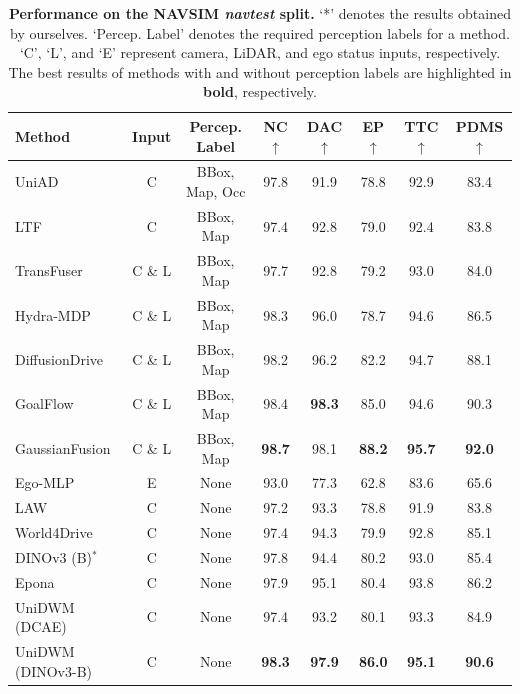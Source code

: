 \begin{table}[t]
\centering
\caption{\textbf{Performance on the NAVSIM \textit{navtest} split.} `*' denotes the results obtained by ourselves. `Percep. Label' denotes the required perception labels for a method. `C', `L', and `E' represent camera, LiDAR, and ego status inputs, respectively. The best results of methods with and without perception labels are highlighted in \textbf{bold}, respectively. }
\begin{tabular}{lccccccc}
\toprule
\textbf{Method} & \textbf{Input} & \textbf{Percep. Label} & \textbf{NC} $\uparrow$ & \textbf{DAC} $\uparrow$ & \textbf{EP} $\uparrow$ & \textbf{TTC} $\uparrow$ & \textbf{PDMS} $\uparrow$ \\
\midrule
UniAD \cite{hu2023planning} & C & BBox, Map, Occ & 97.8 & 91.9 & 78.8 & 92.9 & 83.4 \\
LTF \cite{transfuser} & C & BBox, Map & 97.4 & 92.8 & 79.0 & 92.4 & 83.8 \\
TransFuser \cite{transfuser} & C \& L & BBox, Map & 97.7 & 92.8 & 79.2 & 93.0 & 84.0 \\
Hydra-MDP \cite{li2024hydra} & C \& L & BBox, Map & 98.3 & 96.0 & 78.7 & 94.6 & 86.5 \\
DiffusionDrive \cite{liao2025diffusiondrive} & C \& L & BBox, Map & 98.2 & 96.2 & 82.2 & 94.7 & 88.1 \\
GoalFlow \cite{xing2025goalflow} & C \& L & BBox, Map & 98.4 & \textbf{98.3} & 85.0 & 94.6 & 90.3 \\
GaussianFusion \cite{liu2025gaussianfusion} & C \& L & BBox, Map & \textbf{98.7} & 98.1 & \textbf{88.2} & \textbf{95.7} & \textbf{92.0} \\
\hline
Ego-MLP & E & None & 93.0 & 77.3 & 62.8 & 83.6 & 65.6 \\
LAW \cite{law} & C & None & 97.2 & 93.3 & 78.8 & 91.9 & 83.8 \\
World4Drive \cite{zheng2025world4drive} & C & None & 97.4 & 94.3 & 79.9 & 92.8 & 85.1 \\
DINOv3 (B)$^*$ \cite{dinov3} & C & None & 97.8 & 94.4 & 80.2 & 93.0 & 85.4 \\
Epona \cite{epona} & C & None & 97.9 & 95.1 & 80.4 & 93.8 & 86.2 \\
\rowcolor{cyan!20}
UniDWM (DCAE) & C & None & 97.4 & 93.2 & 80.1 & 93.3 & 84.9 \\
\rowcolor{cyan!20}
UniDWM (DINOv3-B) & C & None & \textbf{98.3} & \textbf{97.9} & \textbf{86.0} & \textbf{95.1} & \textbf{90.6} \\
\bottomrule
\end{tabular}
\label{tab:navsim_pdms}
\end{table}


